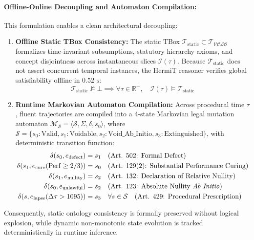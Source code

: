 \documentclass[11pt,a4paper]{article}
\begin{document}
\paragraph{Offline-Online Decoupling and Automaton Compilation:}
This formulation enables a clean architectural decoupling:
\begin{enumerate}[leftmargin=*]
    \item \textbf{Offline Static TBox Consistency:} The static TBox $\mathcal{T}_{\text{static}} \subset \mathcal{T}_{\mathcal{VCLO}}$ formalizes time-invariant subsumptions, statutory hierarchy axioms, and concept disjointness across instantaneous slices $\mathcal{I}(\tau)$. Because $\mathcal{T}_{\text{static}}$ does not assert concurrent temporal instances, the HermiT reasoner verifies global satisfiability offline in $0.52\text{ s}$:
    \begin{equation}
    \mathcal{T}_{\text{static}} \not\models \bot \implies \forall \tau \in \mathbb{R}^+, \quad \mathcal{I}(\tau) \models \mathcal{T}_{\text{static}}
    \end{equation}
    \item \textbf{Runtime Markovian Automaton Compilation:} Across procedural time $\tau$, fluent trajectories are compiled into a 4-state Markovian legal mutation automaton $\mathcal{M}_{\mathcal{S}} = \langle \mathcal{S}, \Sigma, \delta, s_0 \rangle$, where $\mathcal{S} = \{s_0: \text{Valid}, s_1: \text{Voidable}, s_2: \text{Void\_Ab\_Initio}, s_3: \text{Extinguished}\}$, with deterministic transition function:
    \begin{align}
    \delta(s_0, e_{\text{defect}}) &= s_1 \quad (\text{Art. 502: Formal Defect}) \label{eq:trans1} \\
    \delta(s_1, e_{\text{cure}}(\mathrm{Perf} \ge 2/3)) &= s_0 \quad (\text{Art. 129(2): Substantial Performance Curing}) \label{eq:trans2} \\
    \delta(s_1, e_{\text{nullity}}) &= s_2 \quad (\text{Art. 132: Declaration of Relative Nullity}) \label{eq:trans3} \\
    \delta(s_0, e_{\text{unlawful}}) &= s_2 \quad (\text{Art. 123: Absolute Nullity \textit{Ab Initio}}) \label{eq:trans4} \\
    \delta(s, e_{\text{lapse}}(\Delta \tau > 1095)) &= s_3 \quad \forall s \in \mathcal{S} \quad (\text{Art. 429: Procedural Prescription}) \label{eq:trans5}
    \end{align}
\end{enumerate}
Consequently, static ontology consistency is formally preserved without logical explosion, while dynamic non-monotonic state evolution is tracked deterministically in runtime inference.
\end{document}
